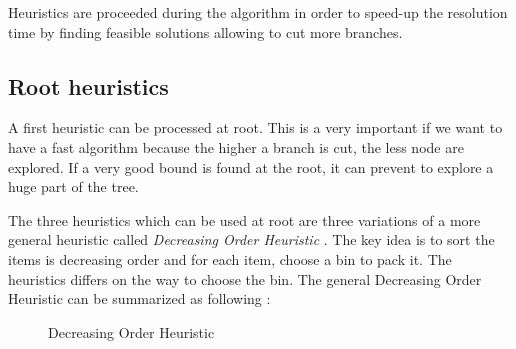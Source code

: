Heuristics are proceeded during the algorithm in order to speed-up the resolution time by finding feasible solutions allowing to cut more branches.

\subsection{Root heuristics}
\label{heuristic-root}

A first heuristic can be processed at root. This is a very important if we want to have a fast algorithm because the higher a branch is cut, the less node are explored. If a very good bound is found at the root, it can prevent to explore a huge part of the tree.

The three heuristics which can be used at root are three variations of a more general heuristic called \textit{Decreasing Order Heuristic} \cite{johnson1973near}. The key idea is to sort the items is decreasing order and for each item, choose a bin to pack it. The heuristics differs on the way to choose the bin. The general Decreasing Order Heuristic can be summarized as following :

\begin{figure}[!ht]
	\centering
	\begin{minipage}{0.5\linewidth}
		\begin{algorithm}[H]
			\DontPrintSemicolon 
			\SetAlgoLined
			\caption{Decreasing Order Heuristic}
		\end{algorithm}
	\end{minipage}
\end{figure}

